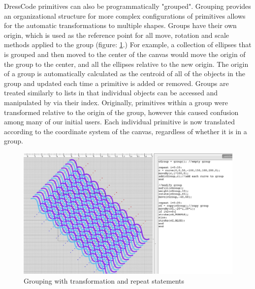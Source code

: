 DressCode primitives can also be programmatically "grouped". Grouping provides an organizational structure for more complex configurations of primitives allows for the automatic transformations to multiple shapes. Groups have their own origin, which is used as the reference point for all move, rotation and scale methods applied to the group (figure: \ref{fig:grouping}.) For example, a collection of ellipses that is grouped and then moved to the center of the canvas would move the origin of the group to the center, and all the ellipses relative to the new origin. The origin of a group is automatically calculated as the centroid of all of the objects in the group and updated each time a primitive is added or removed. Groups are treated similarly to lists in that individual objects can be accessed and manipulated by via their index. Originally, primitives within a group were transformed relative to the origin of the group, however this caused confusion among many of our initial users. Each individual primitive is now translated according to the coordinate system of the canvas, regardless of whether it is in a group. 

 \begin{center}
\begin{figure}[h!]
\includegraphics[width=6.5in]{images/grouping.png}
\caption{Grouping with transformation and repeat statements}
\label{fig:grouping}
\end{figure}
\end{center} 

